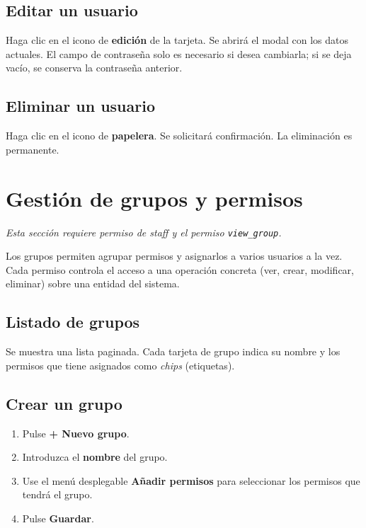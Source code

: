 \documentclass[12pt,a4paper]{article}
\begin{document}
\subsection{Editar un usuario}

Haga clic en el icono de \textbf{edición} de la tarjeta. Se abrirá el modal con los datos actuales. El campo de contraseña solo es necesario si desea cambiarla; si se deja vacío, se conserva la contraseña anterior.

\subsection{Eliminar un usuario}

Haga clic en el icono de \textbf{papelera}. Se solicitará confirmación. La eliminación es permanente.

\section{Gestión de grupos y permisos}

\textit{Esta sección requiere permiso de staff y el permiso \texttt{view\_group}.}

Los grupos permiten agrupar permisos y asignarlos a varios usuarios a la vez. Cada permiso controla el acceso a una operación concreta (ver, crear, modificar, eliminar) sobre una entidad del sistema.

\subsection{Listado de grupos}

Se muestra una lista paginada. Cada tarjeta de grupo indica su nombre y los permisos que tiene asignados como \textit{chips} (etiquetas).

\subsection{Crear un grupo}

\begin{enumerate}
    \item Pulse \textbf{+ Nuevo grupo}.
    \item Introduzca el \textbf{nombre} del grupo.
    \item Use el menú desplegable \textbf{Añadir permisos} para seleccionar los permisos que tendrá el grupo.
    \item Pulse \textbf{Guardar}.
\end{enumerate}
\end{document}
